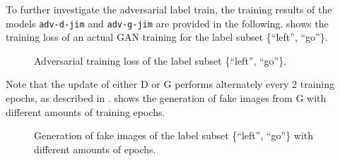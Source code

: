 \FloatBarrier
\noindent
To further investigate the adversarial label train, the training results of the models \texttt{adv-d-jim} and \texttt{adv-g-jim} are provided in the following.
 shows the training loss of an actual GAN training for the label subset \{\enquote{left}, \enquote{go}\}.
\begin{figure}[!ht]
  \centering
  \quad
  \caption{Adversarial training loss of the label subset \{\enquote{left}, \enquote{go}\}.}
  \label{fig:nn_adv_loss_label}
\end{figure}
\FloatBarrier
\noindent
Note that the update of either D or G performs alternately every 2 training epochs, as described in .
 shows the generation of fake images from G with different amounts of training epochs.
\begin{figure}[!ht]
  \centering
  \quad
  \caption{Generation of fake images of the label subset \{\enquote{left}, \enquote{go}\} with different amounts of epochs.}
  \label{fig:nn_adv_fakes_label}
\end{figure}
